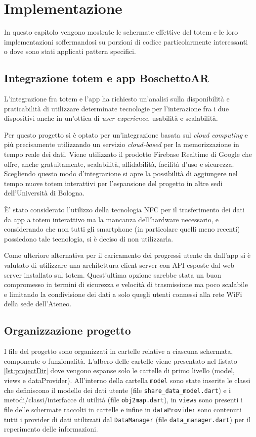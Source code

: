 \chapter{Implementazione}
In questo capitolo vengono mostrate le schermate effettive del totem e le loro implementazioni soffermandosi su porzioni di codice particolarmente interessanti o dove sono stati applicati pattern specifici.

\section{Integrazione totem e app BoschettoAR}
L'integrazione fra totem e l'app ha richiesto un'analisi sulla disponibilità e praticabilità di utilizzare determinate tecnologie per l'interazione fra i due dispositivi anche in un'ottica di \textit{user experience}, usabilità e scalabilità.

Per questo progetto si è optato per un'integrazione basata sul \textit{cloud computing} e più precisamente utilizzando un servizio \textit{cloud-based} per la memorizzazione in tempo reale dei dati. Viene utilizzato il prodotto Firebase Realtime di Google \cite{firebase} che offre, anche gratuitamente, scalabilità, affidabilità, facilità d'uso e sicurezza.
Scegliendo questo modo d'integrazione si apre la possibilità di aggiungere nel tempo nuove totem interattivi per l'espansione del progetto in altre sedi dell'Università di Bologna.

\`E' stato considerato l'utilizzo della tecnologia NFC per il trasferimento dei dati da app a totem interattivo ma la mancanza dell'hardware necessario, e considerando che non tutti gli smartphone (in particolare quelli meno recenti) possiedono tale tecnologia, si è deciso di non utilizzarla.

Come ulteriore alternativa per il caricamento dei progressi utente da dall'app si è valutato di utilizzare una architettura client-server con API esposte dal web-server installato sul totem. Quest'ultima opzione sarebbe stata un buon compromesso in termini di sicurezza e velocità di trasmissione ma poco scalabile e limitando la condivisione dei dati a solo quegli utenti connessi alla rete WiFi della sede dell'Ateneo.

\section{Organizzazione progetto}
I file del progetto sono organizzati in cartelle relative a ciascuna schermata, componente o funzionalità. L'albero delle cartelle viene presentato nel listato \ref{lst:projectDir} dove vengono espanse solo le cartelle di primo livello (model, views e dataProvider). All'interno della cartella \texttt{model} sono state inserite le classi che definiscono il modello dei dati utente (file \texttt{share\_data\_model.dart}) e i metodi/classi/interfacce di utilità (file \texttt{obj2map.dart}), in \texttt{views} sono presenti i file delle schermate raccolti in cartelle e infine in \texttt{dataProvider} sono contenuti tutti i provider di dati utilizzati dal \texttt{DataManager} (file \texttt{data\_manager.dart}) per il reperimento delle informazioni.

